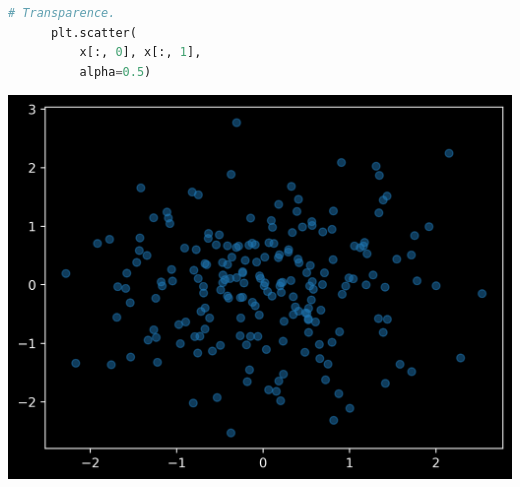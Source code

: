\documentclass[aspectratio=169]{beamer}
\begin{document}
\begin{frame}[fragile]{}{}
  \vfill
  \begin{minipage}{.48\textwidth}
    \begin{lstlisting}[language=Python]
      # Transparence.
      plt.scatter(
          x[:, 0], x[:, 1],
          alpha=0.5)
    \end{lstlisting}
  \end{minipage}%
  \hfill
  \begin{minipage}{.48\textwidth}
    \centering
    \includegraphics[width=\textwidth]{scatter_plot_alpha}
  \end{minipage}
  \vfill
\end{frame}
\end{document}
